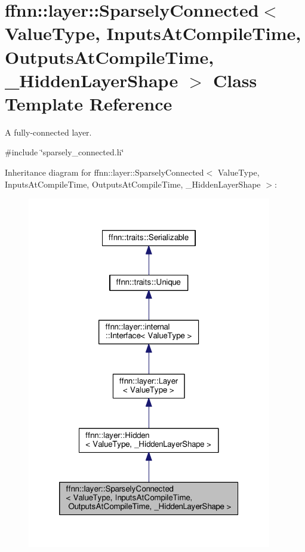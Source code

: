 \hypertarget{classffnn_1_1layer_1_1_sparsely_connected}{\section{ffnn\-:\-:layer\-:\-:Sparsely\-Connected$<$ Value\-Type, Inputs\-At\-Compile\-Time, Outputs\-At\-Compile\-Time, \-\_\-\-Hidden\-Layer\-Shape $>$ Class Template Reference}
\label{classffnn_1_1layer_1_1_sparsely_connected}
}


A fully-\/connected layer.  




{\ttfamily \#include \char`\"{}sparsely\-\_\-connected.\-h\char`\"{}}



Inheritance diagram for ffnn\-:\-:layer\-:\-:Sparsely\-Connected$<$ Value\-Type, Inputs\-At\-Compile\-Time, Outputs\-At\-Compile\-Time, \-\_\-\-Hidden\-Layer\-Shape $>$\-:
\nopagebreak
\begin{figure}[H]
\begin{center}
\leavevmode
\includegraphics[width=302pt]{classffnn_1_1layer_1_1_sparsely_connected__inherit__graph}
\end{center}
\end{figure}


